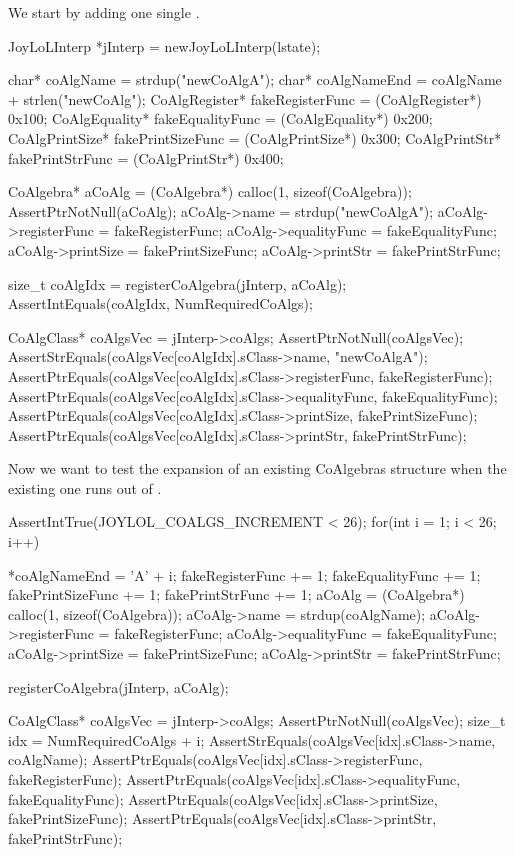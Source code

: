 
We start by adding one single . 

\startCTest
  JoyLoLInterp *jInterp = newJoyLoLInterp(lstate);

  char*           coAlgName         = strdup("newCoAlgA");
  char*           coAlgNameEnd      = coAlgName + strlen("newCoAlg");
  CoAlgRegister*  fakeRegisterFunc  = (CoAlgRegister*)  0x100;
  CoAlgEquality*  fakeEqualityFunc  = (CoAlgEquality*)  0x200;
  CoAlgPrintSize* fakePrintSizeFunc = (CoAlgPrintSize*) 0x300;
  CoAlgPrintStr*  fakePrintStrFunc  = (CoAlgPrintStr*)  0x400;
  
  CoAlgebra* aCoAlg    = (CoAlgebra*) calloc(1, sizeof(CoAlgebra));
  AssertPtrNotNull(aCoAlg);
  aCoAlg->name         = strdup("newCoAlgA");
  aCoAlg->registerFunc = fakeRegisterFunc;
  aCoAlg->equalityFunc = fakeEqualityFunc;
  aCoAlg->printSize    = fakePrintSizeFunc;
  aCoAlg->printStr     = fakePrintStrFunc;
  
  size_t coAlgIdx = registerCoAlgebra(jInterp, aCoAlg);
  AssertIntEquals(coAlgIdx, NumRequiredCoAlgs);
  
  CoAlgClass* coAlgsVec = jInterp->coAlgs;
  AssertPtrNotNull(coAlgsVec);
  AssertStrEquals(coAlgsVec[coAlgIdx].sClass->name, "newCoAlgA");
  AssertPtrEquals(coAlgsVec[coAlgIdx].sClass->registerFunc, fakeRegisterFunc);
  AssertPtrEquals(coAlgsVec[coAlgIdx].sClass->equalityFunc, fakeEqualityFunc);
  AssertPtrEquals(coAlgsVec[coAlgIdx].sClass->printSize,    fakePrintSizeFunc);
  AssertPtrEquals(coAlgsVec[coAlgIdx].sClass->printStr,     fakePrintStrFunc);
\stopCTest

Now we want to test the expansion of an existing CoAlgebras structure when 
the existing one runs out of . 

\startCTest
  AssertIntTrue(JOYLOL_COALGS_INCREMENT < 26);
  for(int i = 1; i < 26; i++) {
    *coAlgNameEnd        = 'A' + i;
    fakeRegisterFunc    += 1;
    fakeEqualityFunc    += 1;
    fakePrintSizeFunc   += 1;
    fakePrintStrFunc    += 1;
    aCoAlg               = (CoAlgebra*) calloc(1, sizeof(CoAlgebra));
    aCoAlg->name         = strdup(coAlgName);
    aCoAlg->registerFunc = fakeRegisterFunc;
    aCoAlg->equalityFunc = fakeEqualityFunc;
    aCoAlg->printSize    = fakePrintSizeFunc;
    aCoAlg->printStr     = fakePrintStrFunc;
    
    registerCoAlgebra(jInterp, aCoAlg);

    CoAlgClass* coAlgsVec = jInterp->coAlgs;
    AssertPtrNotNull(coAlgsVec);
    size_t idx = NumRequiredCoAlgs + i;
    AssertStrEquals(coAlgsVec[idx].sClass->name, coAlgName);
    AssertPtrEquals(coAlgsVec[idx].sClass->registerFunc, fakeRegisterFunc);
    AssertPtrEquals(coAlgsVec[idx].sClass->equalityFunc, fakeEqualityFunc);
    AssertPtrEquals(coAlgsVec[idx].sClass->printSize,    fakePrintSizeFunc);
    AssertPtrEquals(coAlgsVec[idx].sClass->printStr,     fakePrintStrFunc);
  }
\stopCTest

